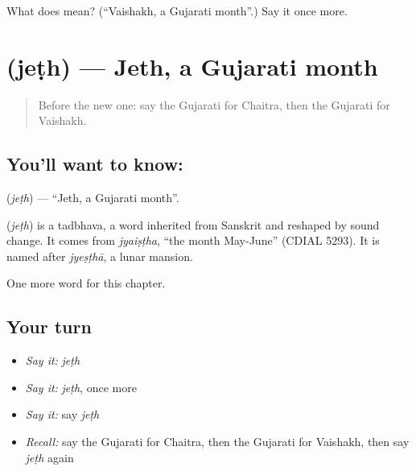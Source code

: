 \begin{tcolorbox}[breakable,colback=teal!4,colframe=teal!35!black,title={Before you move on}]
What does  mean? (\textquotedblleft{}Vaishakh, a Gujarati month\textquotedblright{}.) Say it once more.
\end{tcolorbox}
\section[\texorpdfstring{\gu{જેઠ} (jeṭh)}{જેઠ (jeṭh)}]{ (jeṭh) — Jeth, a Gujarati month}

\label{lesson:GU-C98-jeth}



\begin{quote}
Before the new one: say the Gujarati for Chaitra, then the Gujarati for Vaishakh.
\end{quote}

\subsection*{You'll want to know: }
\textbf{} (\emph{jeṭh}) — \textquotedblleft{}Jeth, a Gujarati month\textquotedblright{}.

\begin{cousinweb}
\textbf{} (\emph{jeṭh}) is a tadbhava, a word inherited from Sanskrit and reshaped by sound change. It comes from \emph{jyaiṣṭha}, \textquotedblleft{}the month May-June\textquotedblright{} (CDIAL 5293). It is named after \emph{jyeṣṭhā}, a lunar mansion.
\end{cousinweb}

\begin{grammarlens}[title={What you've built}]
One more word for this chapter.
\end{grammarlens}

\subsection*{Your turn}
\begin{itemize}
\raggedright
  \item \emph{Say it:} \emph{jeṭh}
  \item \emph{Say it:} \emph{jeṭh}, once more
  \item \emph{Say it:} say \emph{jeṭh}
  \item \emph{Recall:} say the Gujarati for Chaitra, then the Gujarati for Vaishakh, then say \emph{jeṭh} again
\end{itemize}

